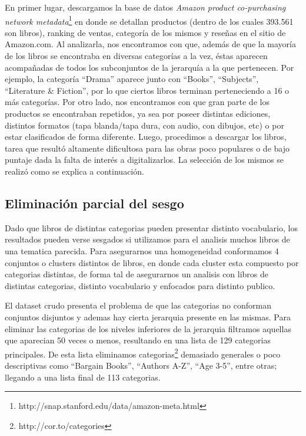 \documentclass[12pt,journal,compsoc]{IEEEtran}
\begin{document}
En primer lugar, descargamos la base de datos \textit{Amazon product co-purchasing network metadata}\footnote{http://snap.stanford.edu/data/amazon-meta.html} en donde se detallan productos (dentro de los cuales 393.561 son libros), ranking de ventas, categoría de los mismos y reseñas en el sitio de Amazon.com. Al analizarla, nos encontramos con que, además de que la mayoría de los libros se encontraba en diversas categorías a la vez, éstas aparecen acompañadas de todos los subconjuntos de la jerarquía a la que pertenecen. Por ejemplo, la categoría ``Drama'' aparece junto con ``Books'', ``Subjects'', ``Literature \& Fiction'', por lo que ciertos libros terminan perteneciendo a 16 o más categorías. Por otro lado, nos encontramos con que gran parte de los productos se encontraban repetidos, ya sea por poseer distintas ediciones, distintos formatos (tapa blanda/tapa dura, con audio, con dibujos, etc) o por estar clasificados de forma diferente. 
Luego, procedimos a descargar los libros, tarea que resultó altamente dificultosa para las obras poco populares o de bajo puntaje dada la falta de interés a digitalizarlos. La selección de los mismos se realizó como se explica a continuación.

\subsection{Eliminación parcial del sesgo}

Dado que libros de distintas categorias pueden presentar distinto vocabulario, los resultados pueden verse sesgados si utilizamos para el analisis muchos libros de una tematica parecida. Para asegurarnos una homogeneidad conformamos 4 conjuntos o clusters distintos de libros, en donde cada cluster esta compuesto por categorias distintas, de forma tal de asegurarnos un analisis con libros de distintas categorias, distinto vocabulario y enfocados para distinto publico.

El dataset crudo presenta el problema de que las categorias no conforman conjuntos disjuntos y ademas hay cierta jerarquia presente en las mismas. Para eliminar las categorias de los niveles inferiores de la jerarquia filtramos aquellas que aparecian 50 veces o menos, resultando en una lista de 129 categorias principales. De esta lista eliminamos categorias\footnote{http://cor.to/categories} demasiado generales o poco descriptivas como ``Bargain Books'', ``Authors A-Z'', ``Age 3-5'', entre otras; llegando a una lista final de 113 categorias.
\end{document}
